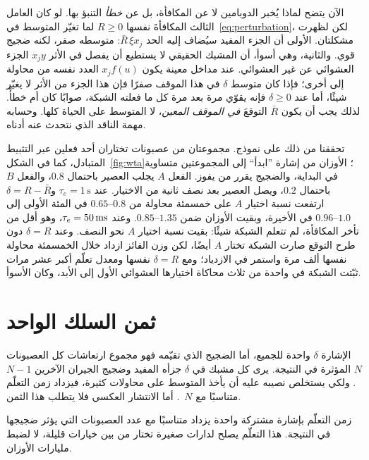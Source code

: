 الآن يتضح لماذا يُخبر الدوبامين لا عن المكافأة، بل عن \emph{خطأ} التنبؤ بها. لو كان العامل الثالث المكافأةَ نفسها $R\ge0$ لما تغيّر المتوسط في~\eqref{eq:perturbation}، لكن لظهرت مشكلتان. الأولى أن الجزء المفيد سيُضاف إليه الحد $\bar R\,\xi x_j$: متوسطه صفر، لكنه ضجيج قوي. والثانية، وهي أسوأ، أن المشبك الحقيقي لا يستطيع أن يفصل في الأثر $x_jy$ الجزء العشوائي عن غير العشوائي. عند مداخل معينة يكون $x_jf(u)$ العدد نفسه من محاولة إلى أخرى؛ فإذا كان متوسط $\delta$ في هذا الموقف صفرًا فإن هذا الجزء من الأثر لا يغيّر شيئًا، أما عند $\delta\ge0$ فإنه يقوّي مرة بعد مرة كل ما فعلته الشبكة، صوابًا كان أم خطأً. لذلك يجب أن يكون $\bar R$ التوقعَ \emph{في الموقف المعين}، لا المتوسط على الحياة كلها. وحسابه مهمة الناقد الذي نتحدث عنه أدناه.

تحققنا من ذلك على نموذج. مجموعتان من عصبونات  تختاران أحد فعلين عبر التثبيط المتبادل، كما في الشكل~\ref{fig:wta}؛ الأوزان من إشارة ”ابدأ“ إلى المجموعتين متساوية في البداية، والضجيج يقرر من يفوز. الفعل $A$ يجلب العصير باحتمال $0.8$، والفعل $B$ باحتمال $0.2$، ويصل العصير بعد نصف ثانية من الاختيار. عند $\tau_e=1\,\text{s}$ و$\delta=R-\bar R$ ارتفعت نسبة اختيار $A$ على خمسمئة محاولة من $0.65\text{--}0.8$ في المئة الأولى إلى $0.96\text{--}1.0$ في الأخيرة، وبقيت الأوزان ضمن $0.85\text{--}1.35$. وعند $\tau_e=50\,\text{ms}$، وهو أقل من تأخر المكافأة، لم تتعلم الشبكة شيئًا: بقيت نسبة اختيار $A$ نحو النصف. وعند $\delta=R$ دون طرح التوقع صارت الشبكة تختار $A$ أيضًا، لكن وزن الفائز ازداد خلال الخمسمئة محاولة نفسها ألف مرة واستمر في الازدياد؛ ومع $\delta=R$ نفسها ومعدل تعلّم أكبر عشر مرات ثبّتت الشبكة في واحدة من ثلاث محاكاة اختيارها العشوائي الأول إلى الأبد، وكان الأسوأ.

\section{ثمن السلك الواحد}

الإشارة $\delta$ واحدة للجميع، أما الضجيج الذي تقيّمه فهو مجموع ارتعاشات كل العصبونات $N$ المؤثرة في النتيجة. يرى كل مشبك في $\delta$ جزأه المفيد وضجيج الجيران الآخرين $N-1$. ولكي يستخلص نصيبه عليه أن يأخذ المتوسط على محاولات كثيرة، فيزداد زمن التعلّم متناسبًا مع $N$~\cite{Werfel2005}. أما الانتشار العكسي فلا يتطلب هذا الثمن.

\begin{keyblock}
\begin{proposition}
\label{prop:broadcastcost}
زمن التعلّم بإشارة مشتركة واحدة يزداد متناسبًا مع عدد العصبونات التي يؤثر ضجيجها في النتيجة. هذا التعلّم يصلح لدارات صغيرة تختار من بين خيارات قليلة، لا لضبط مليارات الأوزان.
\end{proposition}
\end{keyblock}

